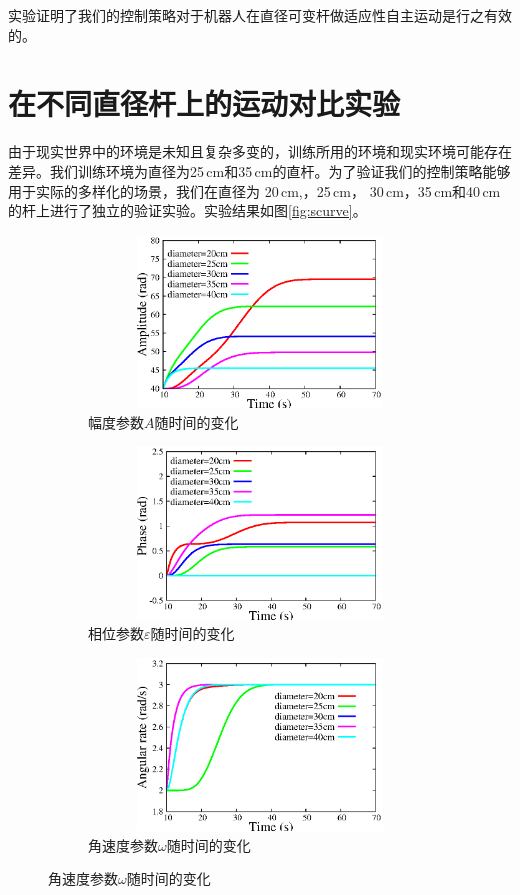 实验证明了我们的控制策略对于机器人在直径可变杆做适应性自主运动是行之有效的。


\section{在不同直径杆上的运动对比实验}

由于现实世界中的环境是未知且复杂多变的，训练所用的环境和现实环境可能存在差异。我们训练环境为直径为25\,cm和35\,cm的直杆。为了验证我们的控制策略能够用于实际的多样化的场景，我们在直径为 20\,cm,，25\,cm， 30\,cm，35\,cm和40\,cm的杆上进行了独立的验证实验。实验结果如图\ref{fig:scurve}。

\begin{figure}[htbp]
	\centering
	\begin{subfigure}{0.45\textwidth}{
			\centering
			\includegraphics[width=1\textwidth,height=130pt]{figure/chap05/samplifier.eps}
			\caption{幅度参数$A$随时间的变化}
			\label{fig:samplifier}
		}
	\end{subfigure}
	\begin{subfigure}{0.45\textwidth}{
			\centering
			\includegraphics[width=1\textwidth,height=130pt]{figure/chap05/sphase.eps}
			\caption{相位参数$\varepsilon$随时间的变化}
			\label{fig:sphase}
		}
	\end{subfigure}
	\begin{subfigure}{0.45\textwidth}{
			\centering
			\includegraphics[width=1\textwidth,height=130pt]{figure/chap05/sarate.eps}	
			\caption{角速度参数$\omega$随时间的变化}
			\label{fig:sarate}
		}

\end{subfigure}
\end{figure}
